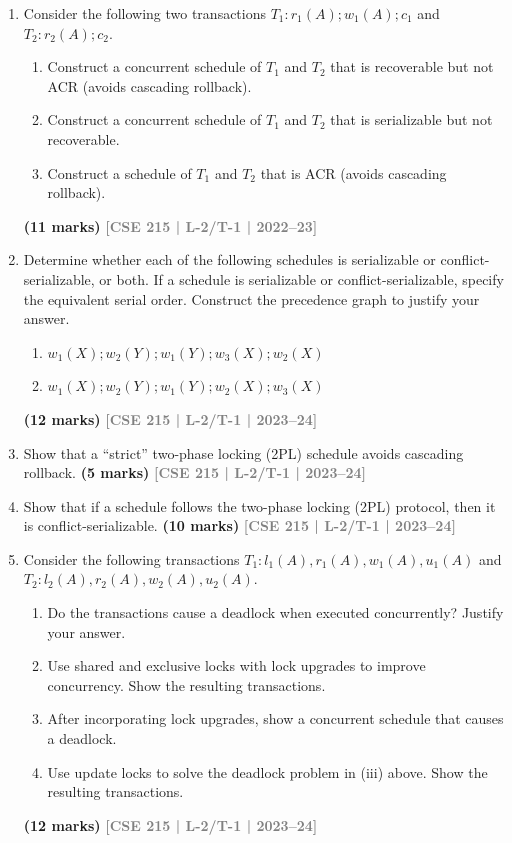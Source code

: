 \documentclass[12pt,a3paper]{article}
\newcommand{\yr}[1]{\hfill\textcolor{gray}{\small\textbf{[#1]}}}
\newcommand{\mk}[1]{\textcolor{orange!70!black}{\small\textbf{(#1 marks)}}}
\begin{document}
\begin{enumerate}
\item Consider the following two transactions $T_1\colon r_1(A); w_1(A); c_1$ and $T_2\colon r_2(A); c_2$.
\begin{enumerate}
  \item Construct a concurrent schedule of $T_1$ and $T_2$ that is recoverable but not ACR (avoids cascading rollback).
  \item Construct a concurrent schedule of $T_1$ and $T_2$ that is serializable but not recoverable.
  \item Construct a schedule of $T_1$ and $T_2$ that is ACR (avoids cascading rollback).
\end{enumerate}
  \mk{11} \yr{CSE 215 | L-2/T-1 | 2022--23}

\item Determine whether each of the following schedules is serializable or conflict-serializable, or both. If a schedule is serializable or conflict-serializable, specify the equivalent serial order. Construct the precedence graph to justify your answer.
\begin{enumerate}
  \item $w_1(X); w_2(Y); w_1(Y); w_3(X); w_2(X)$
  \item $w_1(X); w_2(Y); w_1(Y); w_2(X); w_3(X)$
\end{enumerate}
  \mk{12} \yr{CSE 215 | L-2/T-1 | 2023--24}

\item Show that a ``strict'' two-phase locking (2PL) schedule avoids cascading rollback.
\mk{5} \yr{CSE 215 | L-2/T-1 | 2023--24}

\item Show that if a schedule follows the two-phase locking (2PL) protocol, then it is conflict-serializable.
\mk{10} \yr{CSE 215 | L-2/T-1 | 2023--24}

\item Consider the following transactions $T_1\colon l_1(A), r_1(A), w_1(A), u_1(A)$ and $T_2\colon l_2(A), r_2(A), w_2(A), u_2(A)$.
\begin{enumerate}
  \item Do the transactions cause a deadlock when executed concurrently? Justify your answer.
  \item Use shared and exclusive locks with lock upgrades to improve concurrency. Show the resulting transactions.
  \item After incorporating lock upgrades, show a concurrent schedule that causes a deadlock.
  \item Use update locks to solve the deadlock problem in (iii) above. Show the resulting transactions.
\end{enumerate}
\mk{12} \yr{CSE 215 | L-2/T-1 | 2023--24}


\end{enumerate}
\end{document}
